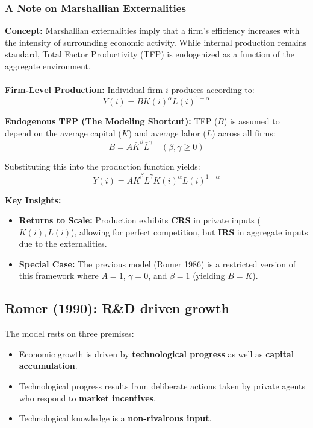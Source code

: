 \subsubsection{A Note on Marshallian Externalities}


\textbf{Concept:} Marshallian externalities imply that a firm's efficiency increases with the intensity of surrounding economic activity. While internal production remains standard, Total Factor Productivity (TFP) is endogenized as a function of the aggregate environment.
\\\\
\noindent \textbf{Firm-Level Production:}
Individual firm $i$ produces according to:
\begin{equation}
    Y(i) = B K(i)^\alpha L(i)^{1-\alpha}
\end{equation}

\noindent \textbf{Endogenous TFP (The Modeling Shortcut):}
TFP ($B$) is assumed to depend on the average capital ($\bar{K}$) and average labor ($\bar{L}$) across all firms:
\begin{equation}
    B = A \bar{K}^\beta \bar{L}^\gamma \quad (\beta, \gamma \geq 0)
\end{equation}

\noindent Substituting this into the production function yields:
\begin{equation}
    Y(i) = A \bar{K}^\beta \bar{L}^\gamma K(i)^\alpha L(i)^{1-\alpha}
\end{equation}

\noindent \textbf{Key Insights:}
\begin{itemize}
    \item \textbf{Returns to Scale:} Production exhibits \textbf{CRS} in private inputs ($K(i), L(i)$), allowing for perfect competition, but \textbf{IRS} in aggregate inputs due to the externalities.
    \item \textbf{Special Case:} The previous model (Romer 1986) is a restricted version of this framework where $A=1$, $\gamma=0$, and $\beta=1$ (yielding $B = \bar{K}$).
\end{itemize}

\subsection{Romer (1990): R\&D driven growth}
The model rests on three premises: 
\begin{itemize}
    \item Economic growth is driven by \textbf{technological progress} as well as \textbf{capital accumulation}.
    \item Technological progress results from deliberate actions
taken by private agents who respond to \textbf{market
incentives}. 
    \item Technological knowledge is a \textbf{non-rivalrous input}.
\end{itemize}


